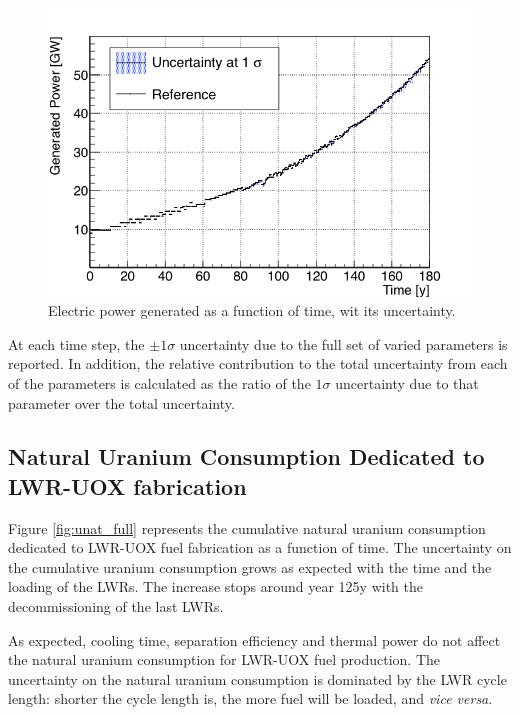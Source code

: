 \documentclass{anstrans}
\begin{document}
\begin{figure}[t] %
    \centering
    \includegraphics[scale=0.3]{power_full}
    \caption{Electric power generated as a function of time, wit its uncertainty.}\label{fig:power_full}
\end{figure}

At each time step, the $\pm1\sigma$ uncertainty due to the full set of varied
parameters is reported.  In addition, the relative contribution to the total
uncertainty from each of the parameters is calculated as the ratio of the
$1\sigma$ uncertainty due to that parameter over the total uncertainty.


\subsection{Natural Uranium Consumption Dedicated to \gls{LWR}-\gls{UOX} fabrication}

Figure \ref{fig:unat_full} represents the cumulative natural uranium consumption
dedicated to \gls{LWR}-\gls{UOX} fuel fabrication as a function of time.  The
uncertainty on the cumulative uranium consumption grows as expected with the
time and the loading of the \glspl{LWR}.  The increase stops around year 125y
with the decommissioning of the last \glspl{LWR}.

As expected, cooling time, separation efficiency and thermal power do not affect
the natural uranium consumption for \gls{LWR}-\gls{UOX} fuel production.  The
uncertainty on the natural uranium consumption is dominated by the \gls{LWR}
cycle length: shorter the cycle length is, the more fuel will be loaded, and
\emph{vice versa}.
\end{document}

